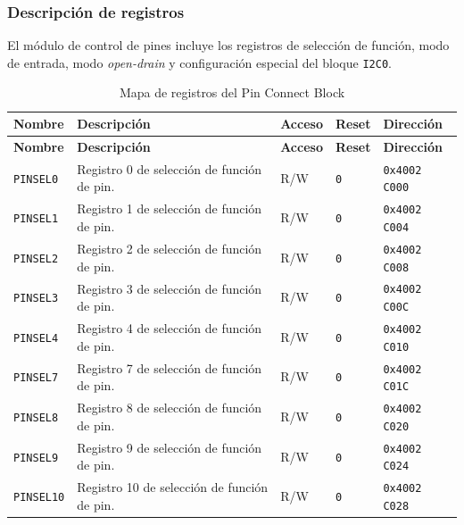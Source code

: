 

\subsubsection{Descripción de registros}
El módulo de control de pines incluye los registros de selección de función, modo de entrada, modo \textit{open-drain} y configuración especial del bloque \texttt{I2C0}.

\begin{longtable}{|>{\raggedright\arraybackslash}p{}|>{\raggedright\arraybackslash}p{}|>{\centering\arraybackslash}p{}|>{\centering\arraybackslash}p{}|>{\raggedright\arraybackslash}p{}|}
\caption{Mapa de registros del Pin Connect Block}\\
\hline
\textbf{Nombre} & \textbf{Descripción} & \textbf{Acceso} & \textbf{Reset} & \textbf{Dirección} \\
\hline
\endfirsthead
\hline
\textbf{Nombre} & \textbf{Descripción} & \textbf{Acceso} & \textbf{Reset} & \textbf{Dirección} \\
\hline
\endhead
\texttt{PINSEL0} & Registro 0 de selección de función de pin. & R/W & \texttt{0} & \texttt{0x4002 C000} \\
\hline
\texttt{PINSEL1} & Registro 1 de selección de función de pin. & R/W & \texttt{0} & \texttt{0x4002 C004} \\
\hline
\texttt{PINSEL2} & Registro 2 de selección de función de pin. & R/W & \texttt{0} & \texttt{0x4002 C008} \\
\hline
\texttt{PINSEL3} & Registro 3 de selección de función de pin. & R/W & \texttt{0} & \texttt{0x4002 C00C} \\
\hline
\texttt{PINSEL4} & Registro 4 de selección de función de pin. & R/W & \texttt{0} & \texttt{0x4002 C010} \\
\hline
\texttt{PINSEL7} & Registro 7 de selección de función de pin. & R/W & \texttt{0} & \texttt{0x4002 C01C} \\
\hline
\texttt{PINSEL8} & Registro 8 de selección de función de pin. & R/W & \texttt{0} & \texttt{0x4002 C020} \\
\hline
\texttt{PINSEL9} & Registro 9 de selección de función de pin. & R/W & \texttt{0} & \texttt{0x4002 C024} \\
\hline
\texttt{PINSEL10} & Registro 10 de selección de función de pin. & R/W & \texttt{0} & \texttt{0x4002 C028} \\

\end{longtable}
